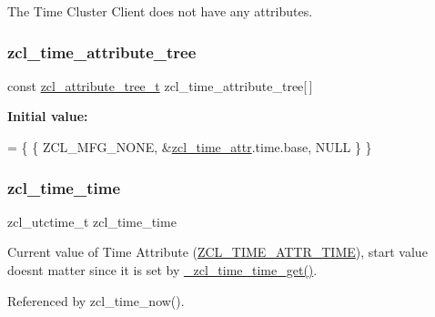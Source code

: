 The Time Cluster Client does not have any attributes. \mbox{\label{group__zcl__time_gabd8e3bd6481f3841825a7596bc131b2f}} 
\subsubsection{\texorpdfstring{zcl\+\_\+time\+\_\+attribute\+\_\+tree}{zcl\_time\_attribute\_tree}}
{\footnotesize\ttfamily const \hyperlink{structzcl__attribute__tree__t}{zcl\+\_\+attribute\+\_\+tree\+\_\+t} zcl\+\_\+time\+\_\+attribute\+\_\+tree\mbox{[}$\,$\mbox{]}}

{\bfseries Initial value\+:}
\begin{DoxyCode}
=
      \{ \{ ZCL\_MFG\_NONE, &\hyperlink{group__zcl__time_gad6a3c9d4f109933785ddc31101dabdc1}{zcl\_time\_attr}.time.base, NULL \} \}
\end{DoxyCode}
\mbox{\label{group__zcl__time_ga4e1da84a7e72ee1626d6328252fd621a}} 
\subsubsection{\texorpdfstring{zcl\+\_\+time\+\_\+time}{zcl\_time\_time}}
{\footnotesize\ttfamily zcl\+\_\+utctime\+\_\+t zcl\+\_\+time\+\_\+time}



Current value of Time Attribute (\hyperlink{group__zcl__time_ga6abf0e2cc70ac533ebe153a40185be63}{Z\+C\+L\+\_\+\+T\+I\+M\+E\+\_\+\+A\+T\+T\+R\+\_\+\+T\+I\+ME}), start value doesn\textquotesingle{}t matter since it is set by \hyperlink{group__zcl__time_ga9c0749b71318a4f7fd28d9112ffd5462}{\+\_\+zcl\+\_\+time\+\_\+time\+\_\+get()}. 



Referenced by zcl\+\_\+time\+\_\+now().

